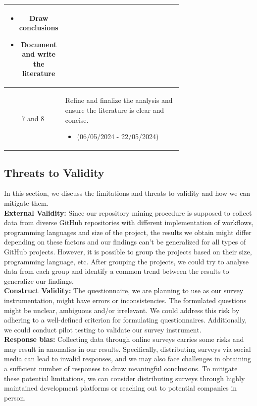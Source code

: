 \documentclass[conference]{IEEEtran}
\begin{document}
\begin{table}[h]
\begin{tabular}{|c|p{0.7\linewidth}|}
\begin{itemize}
                \item Draw conclusions
                \item Document and write the literature
            \end{itemize} \\ \hline
            7 and 8   & Refine and finalize the analysis and ensure the literature is clear and concise. 
	  \begin{itemize}
                \item(06/05/2024 - 22/05/2024)
            \end{itemize} \\ \hline
            \end{tabular}
        \end{table}

    \subsection{Threats to Validity}
        In this section, we discuss the limitations and threats to
        validity and how we can mitigate them.\\

        \textbf{External Validity:} Since our repository mining procedure is supposed to collect data from diverse GitHub repositories with different implementation of workflows, programming languages and size of the project, the results we obtain might differ depending on these factors and our findings can’t be generalized for all types of GitHub projects. However, it is possible to group the projects based on their size, programming language, etc. After grouping the projects, we could try to analyse data from each group and identify a common trend between the results to generalize our findings.\\

	\textbf{Construct Validity:} The questionnaire, we are planning to use as our survey instrumentation, might have errors or inconsistencies. The formulated questions might be unclear, ambiguous and/or irrelevant. We could address this risk by adhering to a well-defined criterion for formulating questionnaires. Additionally, we could conduct pilot testing to validate our survey instrument.\\

        \textbf{Response bias:} Collecting data through online surveys carries some risks and may result in anomalies in our results. Specifically, distributing surveys via social media can lead to invalid responses, and we may also face challenges in obtaining a sufficient number of responses to draw meaningful conclusions. To mitigate these potential limitations, we can consider distributing surveys through highly maintained development platforms or reaching out to potential companies in person. 
\end{document}
